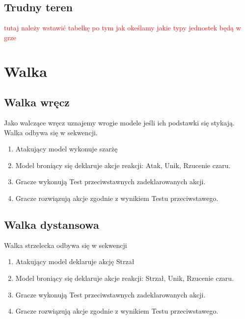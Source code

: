 \subsection{Trudny teren}

\textcolor{red}{tutaj należy wstawić tabelkę po tym jak okeślamy jakie typy jednostek będą w grze} 
\section{Walka}
\subsection{Walka wręcz}
Jako walczące wręcz uznajemy wrogie modele jeśli ich podstawki się stykają. Walka odbywa się w sekwencji.
\begin{enumerate}
    \item Atakujący model wykonuje szarżę
    \item Model broniący się deklaruje akcje reakcji: Atak, Unik, Rzucenie czaru. 
    \item Gracze wykonują Test przeciwstawnych zadeklarowanych akcji.
    \item Gracze rozwiązują akcje zgodnie z wynikiem Testu przeciwstawego. 
\end{enumerate}
\subsection{Walka dystansowa}
Walka strzelecka odbywa się w sekwencji
\begin{enumerate}
    \item Atakujący model deklaruje akcję Strzał
    \item Model broniący się deklaruje akcje reakcji: Strzał, Unik, Rzucenie czaru. 
    \item Gracze wykonują Test przeciwstawnych zadeklarowanych akcji.
    \item Gracze rozwiązują akcje zgodnie z wynikiem Testu przeciwstawego. 
\end{enumerate}

